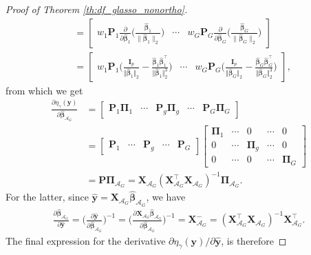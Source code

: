 \documentclass[a4paper, 12pt]{article}
\newcommand{\Aset}{\mathcal{A}}
\newcommand{\betahat}{\widehat{\boldsymbol\beta}}
\newcommand{\T}{\top}
\def\bbeta{\boldsymbol{\beta}}
\def\bPi{\boldsymbol{\Pi}}
\def\by{\boldsymbol{y}}
\def\bI{\mathbf{I}}
\def\bP{\mathbf{P}}
\def\bX{\mathbf{X}}
\def\by{\mathbf{y}}
\begin{document}
\begin{appendix}
\begin{proof}[Proof of Theorem \ref{th:df_glasso_nonortho}]
\begin{equation*}
\begin{aligned}
&= \begin{bmatrix}
w_1 \bP_1\frac{\partial}{\partial\betahat_1}\Big(\frac{ \betahat_1}{\| \betahat_1 \|_2}\Big) & \cdots & w_G \bP_G\frac{\partial}{\partial\betahat_G}\Big(\frac{ \betahat_G}{\| \betahat_G \|_2}\Big)
\end{bmatrix} \\
&= \begin{bmatrix}
w_1\bP_1\Bigg(\frac{\bI_{p}}{\Vert\betahat_1\Vert_2}-\frac{\betahat_1\betahat_1^{\T}}{\Vert\betahat_1\Vert_2^3}\Bigg) & \cdots & w_G\bP_G\Bigg(\frac{\bI_{p}}{\Vert\betahat_G\Vert_2}-\frac{\betahat_G\betahat_G^{\T}}{\Vert\betahat_G\Vert_2^3}\Bigg)
\end{bmatrix},
\end{aligned}
\end{equation*}
from which we get
\begin{equation*}
\begin{aligned}
\frac{\partial \eta_\gamma(\by)}{\partial\betahat_{\Aset_G}} &= \begin{bmatrix}
\bP_1 \bPi_1 & \cdots & \bP_g \bPi_g & \cdots & \bP_G \bPi_G
\end{bmatrix}\\
&= \begin{bmatrix}
\bP_1  & \cdots & \bP_g  & \cdots & \bP_G 
\end{bmatrix} \begin{bmatrix}
\bPi_1 & \cdots & 0 & \cdots & 0\\
0 & \cdots & \bPi_g & \cdots & 0 \\
0 & \cdots & 0 & \cdots &\bPi_G
\end{bmatrix}\\
&= \bP \bPi_{\Aset_G}= \bX_{\Aset_G}(\bX_{\Aset_G}^{\T}\bX_{\Aset_G})^{-1} \bPi_{\Aset_G}.
\end{aligned}
\end{equation*}
For the latter, since $\widehat{\by}=\bX_{\Aset_G}\betahat_{\Aset_G}$, we have
\begin{equation*}
\begin{aligned}
\frac{\partial\betahat_{\Aset_G}}{\partial \widehat{\by}}=  
\bigg(\frac{\partial \widehat{\by}}{\partial\betahat_{\Aset_G}}\bigg)^{-1} = \bigg( \frac{\partial \bX_{\Aset_G}\widehat{\bbeta}_{\Aset_G}}{\partial \widehat{\bbeta}_{\Aset_G}}\bigg)^{-1} = \bX_{\Aset_G}^-=(\bX_{\Aset_G}^{\T}\bX_{\Aset_G})^{-1}\bX_{\Aset_G}^{\T}.
\end{aligned}
\end{equation*}
The final expression for the derivative $\partial\eta_\gamma(\by) / \partial \widehat{\by}$, is therefore

\end{proof}
\end{appendix}
\end{document}
